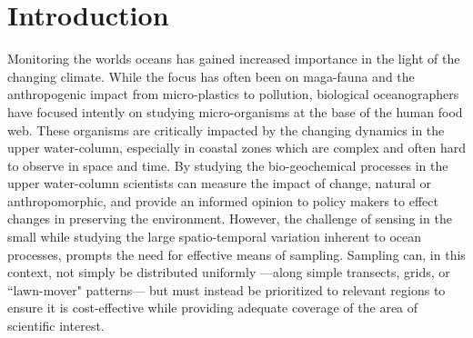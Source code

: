 \documentclass[aoas]{imsart}
\begin{document}
\begin{frontmatter}
\begin{abstract}
\end{abstract}


\begin{keyword}
\end{keyword}

\end{frontmatter}

\section{Introduction}

Monitoring the worlds oceans has gained increased importance in the
light of the changing climate. While the focus has often been on
maga-fauna and the anthropogenic impact from micro-plastics to
pollution, biological oceanographers have focused intently on studying
micro-organisms at the base of the human food web. These organisms are
critically impacted by the changing dynamics in the upper water-column,
especially in coastal zones which are complex and often hard to observe
in space and time. By studying the bio-geochemical processes in the
upper water-column scientists can measure the impact of change, natural
or anthropomorphic, and provide an informed opinion to policy makers to
effect changes in preserving the environment. However, the challenge of 
sensing in the small%
while studying the large spatio-temporal variation inherent to ocean
processes, prompts the need for effective means of sampling.
Sampling can, in this context, not simply be distributed uniformly
---along simple transects, grids, or ``lawn-mover" patterns--- but must
instead be prioritized to relevant regions to ensure it is
cost-effective while providing adequate coverage of the area of
scientific interest.
\end{document}
